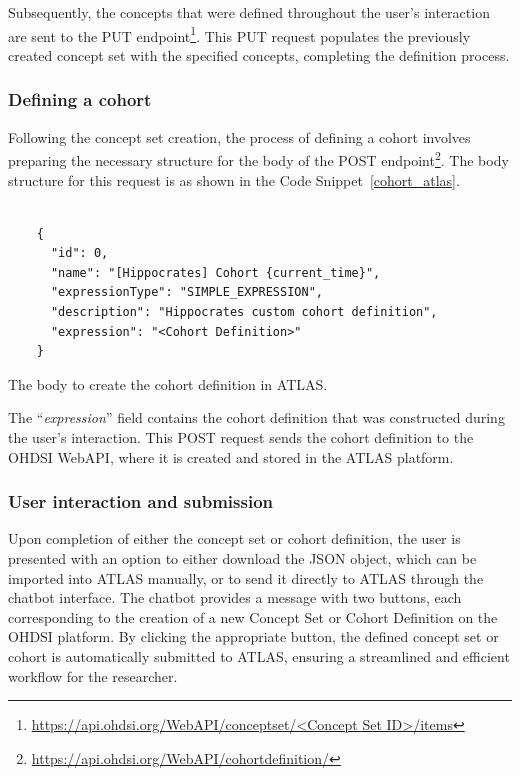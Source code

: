 Subsequently, the concepts that were defined throughout the user's interaction are sent to the PUT endpoint\footnote{\url{https://api.ohdsi.org/WebAPI/conceptset/<Concept Set ID>/items}}. This PUT request populates the previously created concept set with the specified concepts, completing the definition process.

\subsubsection{Defining a cohort}

Following the concept set creation, the process of defining a cohort involves preparing the necessary structure for the body of the POST endpoint\footnote{\url{https://api.ohdsi.org/WebAPI/cohortdefinition/}}. The body structure for this request is as shown in the Code Snippet~\ref{cohort_atlas}.


\begin{listing}[H]
  \begin{verbatim}
      
    {
      "id": 0,
      "name": "[Hippocrates] Cohort {current_time}",
      "expressionType": "SIMPLE_EXPRESSION",
      "description": "Hippocrates custom cohort definition",
      "expression": "<Cohort Definition>"
    }

  \end{verbatim}
  \caption[The body to create the cohort definition in ATLAS]{The body to create the cohort definition in ATLAS.}
  \label{cohort_atlas}
\end{listing}


The ``\textit{expression}'' field contains the cohort definition that was constructed during the user's interaction. This POST request sends the cohort definition to the OHDSI WebAPI, where it is created and stored in the ATLAS platform.

\subsubsection{User interaction and submission}

Upon completion of either the concept set or cohort definition, the user is presented with an option to either download the JSON object, which can be imported into ATLAS manually, or to send it directly to ATLAS through the chatbot interface. The chatbot provides a message with two buttons, each corresponding to the creation of a new Concept Set or Cohort Definition on the OHDSI platform. By clicking the appropriate button, the defined concept set or cohort is automatically submitted to ATLAS, ensuring a streamlined and efficient workflow for the researcher.




